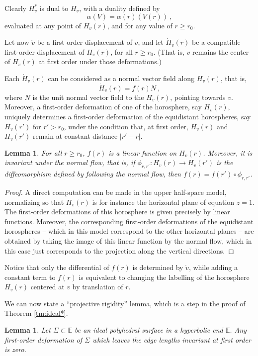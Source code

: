 \documentclass[notitlepage,twoside,a4paper]{amsart}
\newtheorem{lemma}[theorem]{\rm\bf Lemma}
\theoremstyle{named}
\newcommand{\bE}{{\mathbb E}}
\begin{document}
Clearly $H^*_v$ is dual to $H_v$, with a duality defined by
$$ \alpha(V)=\alpha(r)(V(r))~, $$
evaluated at any point of $H_v(r)$, and for any value of $r\geq r_0$.

Let now $\dot v$ be a first-order displacement of $v$, and let $\dot H_v(r)$ be a compatible first-order displacement of $H_v(r)$, for all $r\geq r_0$. (That is, $v$ remains the center of $H_v(r)$ at first order under those deformations.) 

Each $\dot H_v(r)$ can be considered as a normal vector field along $H_v(r)$, that is,
$$ \dot H_v(r) = f(r) N~, $$
where $N$ is the unit normal vector field to the $H_v(r)$, pointing towards $v$. Moreover, a first-order deformation of one of the horosphere, say $H_v(r)$, uniquely determines a first-order deformation of the equidistant horospheres, say $H_v(r')$ for $r'>r_0$, under the condition that, at first order, $H_v(r)$ and $H_v(r')$ remain at constant distance $|r'-r|$.

\begin{lemma}
  For all $r\geq r_0$, $f(r)$ is a linear function on $H_v(r)$. Moreover, it is invariant under the normal flow, that is, if $\phi_{r,r'}:H_v(r)\to H_v(r')$ is the diffeomorphism defined by following the normal flow, then $f(r)=f(r')\circ \phi_{r,r'}$.
\end{lemma}

\begin{proof}
  A direct computation can be made in the upper half-space model, normalizing so that $H_v(r)$ is for instance the horizontal plane of equation $z=1$. The first-order deformations of this horosphere is given precisely by linear functions. Moreover, the corresponding first-order deformations of the equidistant horospheres -- which in this model correspond to the other horizontal planes -- are obtained by taking the image of this linear function by the normal flow, which in this case just corresponds to the projection along the vertical directions.
\end{proof}

Notice that only the differential of $f(r)$ is determined by $\dot v$, while adding a constant term to $f(r)$ is equivalent to changing the labelling of the horosphere $H_v(r)$ centered at $v$ by translation of $r$.

We can now state a ``projective rigidity'' lemma, which is a step in the proof of Theorem \ref{tm:ideal*}.

\begin{lemma} \label{lm:prorig-ideal*}
  Let $\Sigma \subset\bE$ be an ideal polyhedral surface in a hyperbolic end $\bE$. Any first-order deformation of $\Sigma$ which leaves the edge lengths invariant at first order is zero.
\end{lemma}
\end{document}
